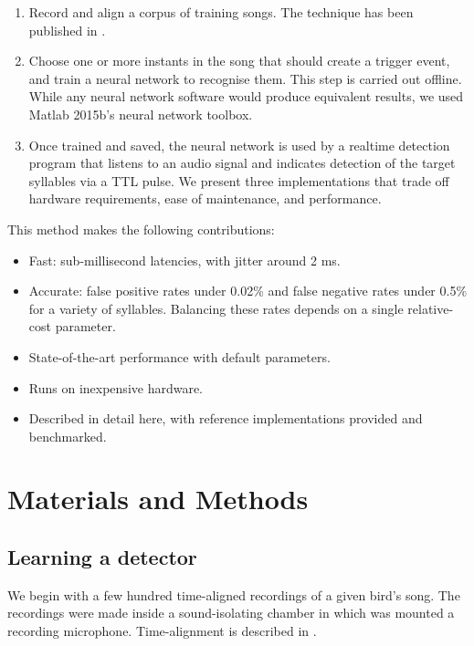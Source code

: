 \documentclass[10pt,letterpaper]{article}
\begin{document}
\begin{enumerate}
\item Record and align a corpus of training songs.  The technique has been published in \cite{Poole2012}.
\item Choose one or more instants in the song that should create a trigger event, and train a
  neural network to recognise them. This step is carried out offline.  While any neural network software would produce equivalent results, we used Matlab 2015b's neural network toolbox.
\item Once trained and saved, the neural network is used by a realtime
  detection program that listens to an audio signal and indicates detection of the target
  syllables via a TTL pulse.  We present three implementations that trade off hardware requirements, ease of maintenance, and performance.
\end{enumerate}
This method makes the following contributions:
\begin{itemize}
\item Fast: sub-millisecond latencies, with jitter around 2 ms.
\item Accurate: false positive rates under 0.02\% and false negative rates under 0.5\% for a variety of syllables.  Balancing these rates depends on a single relative-cost parameter.
\item State-of-the-art performance with default parameters.
\item Runs on inexpensive hardware.
\item Described in detail here, with reference implementations provided and benchmarked.
\end{itemize}



\section{Materials and Methods}
\label{sec:method}

\subsection{Learning a detector}

We begin with a few hundred time-aligned recordings of a given bird's
song.  The recordings were made inside a sound-isolating chamber in which was mounted a recording microphone.  Time-alignment is described in \cite{Poole2012}.
\end{document}

